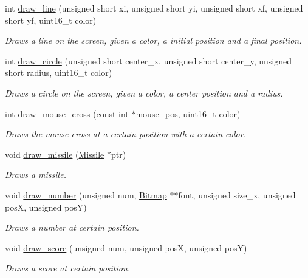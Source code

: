 \begin{DoxyCompactItemize}
int \hyperlink{group__video__gr_ga0b618a385e591f8690388281fd79a351}{draw\+\_\+line} (unsigned short xi, unsigned short yi, unsigned short xf, unsigned short yf, uint16\+\_\+t color)
\begin{DoxyCompactList}\small\item\em Draws a line on the screen, given a color, a initial position and a final position. \end{DoxyCompactList}\item 
int \hyperlink{group__video__gr_ga6494f21641e972c58acdaedcf9c80520}{draw\+\_\+circle} (unsigned short center\+\_\+x, unsigned short center\+\_\+y, unsigned short radius, uint16\+\_\+t color)
\begin{DoxyCompactList}\small\item\em Draws a circle on the screen, given a color, a center position and a radius. \end{DoxyCompactList}\item 
int \hyperlink{group__video__gr_ga5cb0e000108ddc786148172ee56903c3}{draw\+\_\+mouse\+\_\+cross} (const int $\ast$mouse\+\_\+pos, uint16\+\_\+t color)
\begin{DoxyCompactList}\small\item\em Draws the mouse cross at a certain position with a certain color. \end{DoxyCompactList}\item 
void \hyperlink{group__video__gr_ga4270ae09ddc191cdc0e767e4412c386a}{draw\+\_\+missile} (\hyperlink{group___missile_ga7ea98f7c879356e5dfa41934529d86e1}{Missile} $\ast$ptr)
\begin{DoxyCompactList}\small\item\em Draws a missile. \end{DoxyCompactList}\item 
void \hyperlink{group__video__gr_ga8dca584eb65462cd691cb94a9ec92602}{draw\+\_\+number} (unsigned num, \hyperlink{struct_bitmap}{Bitmap} $\ast$$\ast$font, unsigned size\+\_\+x, unsigned posX, unsigned posY)
\begin{DoxyCompactList}\small\item\em Draws a number at certain position. \end{DoxyCompactList}\item 
void \hyperlink{group__video__gr_ga07c3ec445f5548c09a75b0aacf262830}{draw\+\_\+score} (unsigned num, unsigned posX, unsigned posY)
\begin{DoxyCompactList}\small\item\em Draws a score at certain position. \end{DoxyCompactList}\item 
$$
\end{DoxyCompactItemize}
